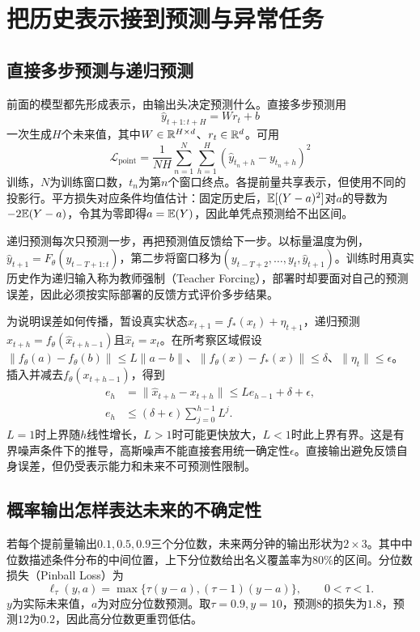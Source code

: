 \section{把历史表示接到预测与异常任务}
\subsection{直接多步预测与递归预测}
\label{sec:sequence-direct-recursive}
前面的模型都先形成表示，由输出头决定预测什么。直接多步预测用
\[
\hat y_{t+1:t+H}=Wr_t+b
\]
一次生成$H$个未来值，其中$W\in\mathbb{R}^{H\times d}$、$r_t\in\mathbb{R}^d$。可用
\begin{equation}
 \mathcal L_{\mathrm{point}}=\frac{1}{NH}\sum_{n=1}^N\sum_{h=1}^H(\hat y_{t_n+h}-y_{t_n+h})^2
\end{equation}
训练，$N$为训练窗口数，$t_n$为第$n$个窗口终点。各提前量共享表示，但使用不同的投影行。平方损失对应条件均值估计：固定历史后，$\mathbb{E}[(Y-a)^2]$对$a$的导数为$-2\mathbb{E}(Y-a)$，令其为零即得$a=\mathbb{E}(Y)$，因此单凭点预测给不出区间。

递归预测每次只预测一步，再把预测值反馈给下一步。以标量温度为例，$\hat y_{t+1}=F_\theta(y_{t-T+1:t})$，第二步将窗口移为$(y_{t-T+2},\ldots,y_t,\hat y_{t+1})$。训练时用真实历史作为递归输入称为教师强制（Teacher Forcing），部署时却要面对自己的预测误差，因此必须按实际部署的反馈方式评价多步结果。

为说明误差如何传播，暂设真实状态$x_{t+1}=f_*(x_t)+\eta_{t+1}$，递归预测$\hat x_{t+h}=f_\theta(\hat x_{t+h-1})$且$\hat x_t=x_t$。在所考察区域假设$\|f_\theta(a)-f_\theta(b)\|\leq L\|a-b\|$、$\|f_\theta(x)-f_*(x)\|\leq\delta$、$\|\eta_t\|\leq\epsilon$。插入并减去$f_\theta(x_{t+h-1})$，得到
\begin{align}
 e_h&=\|\hat x_{t+h}-x_{t+h}\|\leq Le_{h-1}+\delta+\epsilon,\\
 e_h&\leq(\delta+\epsilon)\sum_{j=0}^{h-1}L^j.
\end{align}
$L=1$时上界随$h$线性增长，$L>1$时可能更快放大，$L<1$时此上界有界。这是有界噪声条件下的推导，高斯噪声不能直接套用统一确定性$\epsilon$。直接输出避免反馈自身误差，但仍受表示能力和未来不可预测性限制。

\subsection{概率输出怎样表达未来的不确定性}
\label{sec:sequence-probabilistic}
若每个提前量输出$0.1,0.5,0.9$三个分位数，未来两分钟的输出形状为$2\times3$。其中中位数描述条件分布的中间位置，上下分位数给出名义覆盖率为$80\%$的区间。分位数损失（Pinball Loss）为
\begin{equation}
 \ell_\tau(y,a)=\max\{\tau(y-a),(\tau-1)(y-a)\},\qquad 0<\tau<1.
\end{equation}
$y$为实际未来值，$a$为对应分位数预测。取$\tau=0.9,y=10$，预测$8$的损失为$1.8$，预测$12$为$0.2$，因此高分位数更重罚低估。

